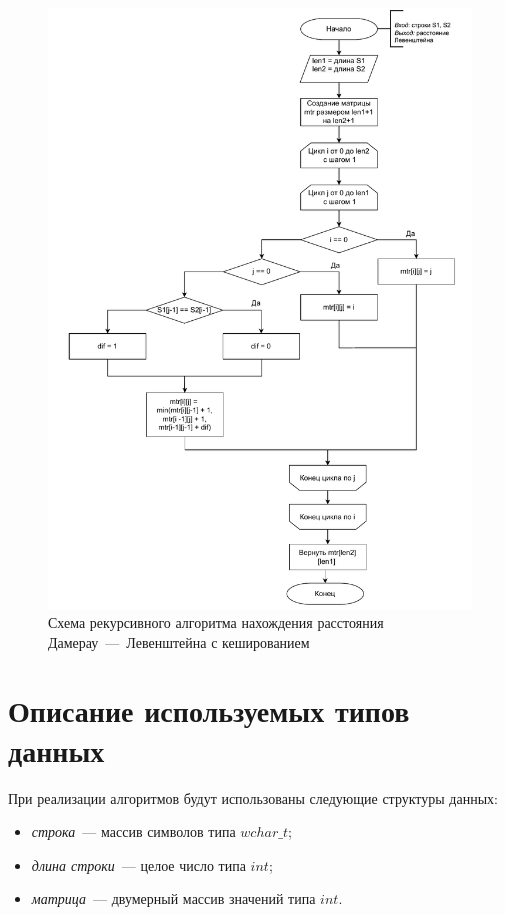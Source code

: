 \begin{figure}[h]
	\centering
	\includegraphics[height=0.9\textheight, page=5]{img/algorithms.pdf}
	\caption{Схема рекурсивного алгоритма нахождения расстояния Дамерау~---~Левенштейна с кешированием}
	\label{fig:DLrechash}
\end{figure}

\clearpage

\section{Описание используемых типов данных}

При реализации алгоритмов будут использованы следующие структуры данных:

\begin{itemize}
	\item \textit{строка}~--- массив символов типа $wchar{\_}t$;
	\item \textit{длина строки}~--- целое число типа $int$;
	\item \textit{матрица}~--- двумерный массив значений типа $int$.
\end{itemize}

